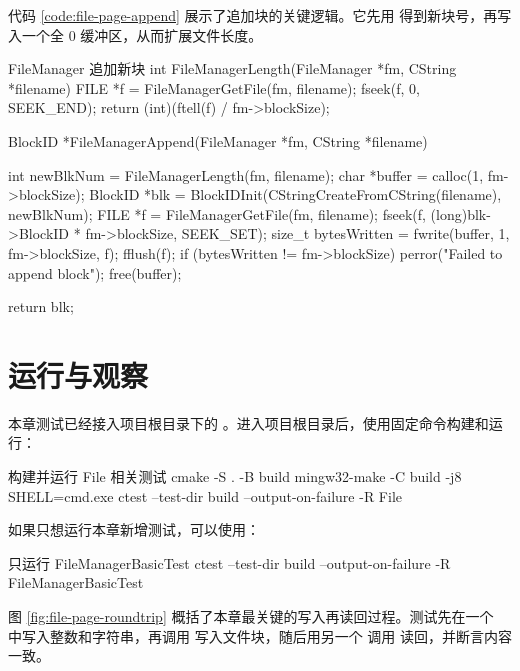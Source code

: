 代码 \ref{code:file-page-append} 展示了追加块的关键逻辑。它先用  得到新块号，再写入一个全 0 缓冲区，从而扩展文件长度。

\begin{dbcode}{FileManager 追加新块}
int FileManagerLength(FileManager *fm, CString *filename) {
    FILE *f = FileManagerGetFile(fm, filename);
    fseek(f, 0, SEEK_END);
    return (int)(ftell(f) / fm->blockSize);
}

BlockID *FileManagerAppend(FileManager *fm, CString *filename) {
    int newBlkNum = FileManagerLength(fm, filename);
    char *buffer = calloc(1, fm->blockSize);
    BlockID *blk = BlockIDInit(CStringCreateFromCString(filename), newBlkNum);
    FILE *f = FileManagerGetFile(fm, filename);
    fseek(f, (long)blk->BlockID * fm->blockSize, SEEK_SET);
    size_t bytesWritten = fwrite(buffer, 1, fm->blockSize, f);
    fflush(f);
    if (bytesWritten != fm->blockSize) {
        perror("Failed to append block");
    }
    free(buffer);

    return blk;
}
\end{dbcode}
\label{code:file-page-append}

\section{运行与观察}
\label{sec:file-page-run}

本章测试已经接入项目根目录下的 。进入项目根目录后，使用固定命令构建和运行：

\begin{dbcode}[listing options={language=bash}]{构建并运行 File 相关测试}
cmake -S . -B build
mingw32-make -C build -j8 SHELL=cmd.exe
ctest --test-dir build --output-on-failure -R File
\end{dbcode}

如果只想运行本章新增测试，可以使用：

\begin{dbcode}[listing options={language=bash}]{只运行 FileManagerBasicTest}
ctest --test-dir build --output-on-failure -R FileManagerBasicTest
\end{dbcode}

图 \ref{fig:file-page-roundtrip} 概括了本章最关键的写入再读回过程。测试先在一个  中写入整数和字符串，再调用  写入文件块，随后用另一个  调用  读回，并断言内容一致。


